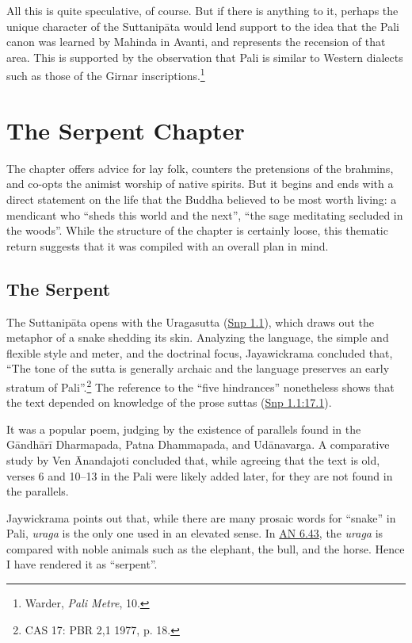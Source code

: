 \documentclass[12pt,openany]{book}%
\begin{document}
All this is quite speculative, of course. But if there is anything to it, perhaps the unique character of the \textsanskrit{Suttanipāta} would lend support to the idea that the Pali canon was learned by Mahinda in Avanti, and represents the recension of that area. This is supported by the observation that Pali is similar to Western dialects such as those of the Girnar inscriptions.\footnote{Warder, \textit{Pali Metre}, 10. }

\section*{The Serpent Chapter}

The chapter offers advice for lay folk, counters the pretensions of the brahmins, and co-opts the animist worship of native spirits. But it begins and ends with a direct statement on the life that the Buddha believed to be most worth living: a mendicant who “sheds this world and the next”, “the sage meditating secluded in the woods”. While the structure of the chapter is certainly loose, this thematic return suggests that it was compiled with an overall plan in mind.

\subsection*{The Serpent}

The \textsanskrit{Suttanipāta} opens with the Uragasutta (\href{https://suttacentral.net/snp1.1/en/sujato}{Snp 1.1}), which draws out the metaphor of a snake shedding its skin. Analyzing the language, the simple and flexible style and meter, and the doctrinal focus, Jayawickrama concluded that, “The tone of the sutta is generally archaic and the language preserves an early stratum of Pali”.\footnote{CAS 17: PBR 2,1 1977, p. 18. } The reference to the “five hindrances” nonetheless shows that the text depended on knowledge of the prose suttas (\href{https://suttacentral.net/snp1.1/en/sujato\#17.1}{Snp 1.1:17.1}).

It was a popular poem, judging by the existence of parallels found in the \textsanskrit{Gāndhārī} Dharmapada, Patna Dhammapada, and \textsanskrit{Udānavarga}. A comparative study by Ven Ānandajoti concluded that, while agreeing that the text is old, verses 6 and 10–13 in the Pali were likely added later, for they are not found in the parallels.

Jaywickrama points out that, while there are many prosaic words for “snake” in Pali, \textit{uraga} is the only one used in an elevated sense. In \href{https://suttacentral.net/an6.43/en/sujato}{AN 6.43}, the \textit{uraga} is compared with noble animals such as the elephant, the bull, and the horse. Hence I have rendered it as “serpent”.
\end{document}

